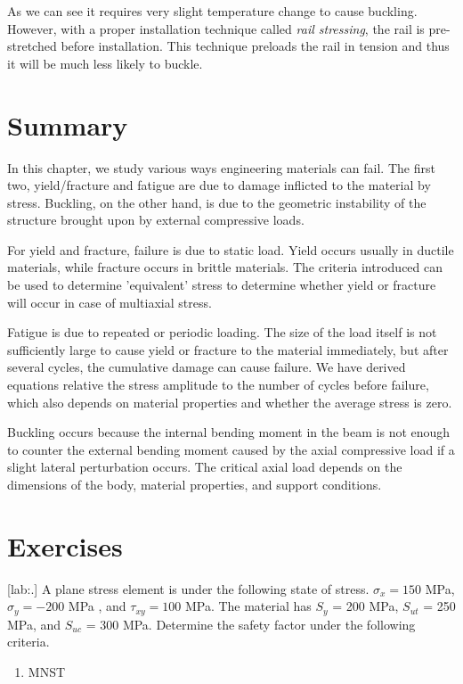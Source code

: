 \documentclass[a4paper,openany,12pt]{book}
\begin{document}
{{As we can see it requires very slight temperature change to cause
buckling. However, with a proper installation technique called \emph{rail
stressing}, the rail is pre-stretched before installation. This
technique preloads the rail in tension and thus it will be much less
likely to buckle.

\section{Summary}
\label{sec:org5473a87}
In this chapter, we study various ways engineering materials can fail.
The first two, yield/fracture and fatigue are due to damage inflicted to
the material by stress. Buckling, on the other hand, is due to the
geometric instability of the structure brought upon by external
compressive loads.

For yield and fracture, failure is due to static load. Yield occurs
usually in ductile materials, while fracture occurs in brittle
materials. The criteria introduced can be used to determine 'equivalent'
stress to determine whether yield or fracture will occur in case of
multiaxial stress.

Fatigue is due to repeated or periodic loading. The size of the load
itself is not sufficiently large to cause yield or fracture to the
material immediately, but after several cycles, the cumulative damage
can cause failure. We have derived equations relative the stress
amplitude to the number of cycles before failure, which also depends on
material properties and whether the average stress is zero.

Buckling occurs because the internal bending moment in the beam is not
enough to counter the external bending moment caused by the axial
compressive load if a slight lateral perturbation occurs. The critical
axial load depends on the dimensions of the body, material properties,
and support conditions.

\section{Exercises}
\label{sec:org6b96ed6}
[lab:.] A plane stress element is
under the following state of stress. \(\sigma_x = 150\) MPa,
\(\sigma_y = -200\) MPa , and \(\tau_{xy} = 100\) MPa. The material has
\(S_y\) = 200 MPa, \(S_{ut}\) = 250 MPa, and \(S_{uc}\) = 300 MPa. Determine
the safety factor under the following criteria.

\begin{enumerate}
\item MNST


\end{enumerate}}}
\end{document}
